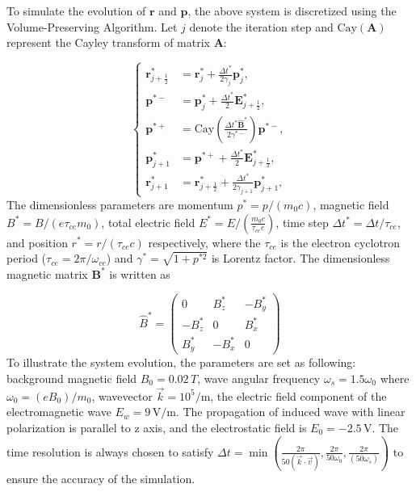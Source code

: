 \documentclass{cpbtex3}
\begin{document}
To simulate the evolution of $\bm{r}$ and $\bm{p}$, the above system is discretized using the Volume-Preserving Algorithm\cite{zhang2015volume,liu2016collisionless}. Let $j$ denote the iteration step and $\text{Cay}(\bm{A})$ represent the Cayley transform of matrix $\bm{A}$:

\begin{equation}
\left\{
\begin{aligned}
\bm{r}^*_{j+\frac{1}{2}} &= \bm{r}^*_j + \frac{\Delta t^*}{2 \gamma_j} \bm{p}^*_j, \\
\bm{p}^{*-} &= \bm{p}^*_j + \frac{\Delta t^*}{2} \bm{E}^*_{j+\frac{1}{2}}, \\
\bm{p}^{*+} &= \text{Cay} \left( \frac{\Delta t^* \hat{\bm{B}}^*}{2 \gamma^{*-}} \right) \bm{p}^{*-}, \\
\bm{p}^*_{j+1} &= \bm{p}^{*+} + \frac{\Delta t^*}{2} \bm{E}^*_{j+\frac{1}{2}}, \\
\bm{r}^*_{j+1} &= \bm{r}^*_{j+\frac{1}{2}} + \frac{\Delta t^*}{2 \gamma_{j+1}} \bm{p}^*_{j+1},
\end{aligned}
\right.
\end{equation}
The dimensionless parameters are momentum \( p^* = p/(m_0 c) \), magnetic field \( B^* = B/(e \tau_{ce} m_0) \), total electric field \( E^* = E/(\frac{m_0 c}{\tau_{ce} e}) \), time step \( \Delta t^* = \Delta t / \tau_{ce} \), and position \( r^* = r / (\tau_{ce} c) \) respectively, where the \( \tau_{ce} \) is the electron cyclotron period (\( \tau_{ce} = 2\pi / \omega_{ce} \)) and \( \gamma^* = \sqrt{1 + p^{*2}} \) is Lorentz factor. The dimensionless magnetic matrix \( \mathbf{B}^* \) \cite{zhang2015volume} is written as

\begin{equation}
\hat{B}^* =
\begin{pmatrix}
0 & B_z^* & -B_y^* \\
-B_z^* & 0 & B_x^* \\
B_y^* & -B_x^* & 0
\end{pmatrix}
\end{equation}
To illustrate the system evolution, the parameters are set as following: background magnetic field \( B_0 = 0.02\,T \), wave angular frequency \( \omega_s = 1.5 \omega_0 \) where \( \omega_0 = (e B_0)/m_0 \), wavevector \( \vec{k} = 10^5/\mathrm{m} \), the electric field component of the electromagnetic wave \( E_w = 9\,\mathrm{V/m} \). The propagation of induced wave with linear polarization is parallel to z axis, and the electrostatic field is \( E_0 = -2.5\,\mathrm{V} \). The time resolution is always chosen to satisfy 
\(
\Delta t = \min \left( \frac{2\pi}{50(\vec{k} \cdot \vec{v})}, \frac{2\pi}{50\omega_0}, \frac{2\pi}{(50\omega_s)} \right)
\)
to ensure the accuracy of the simulation.
\end{document}
